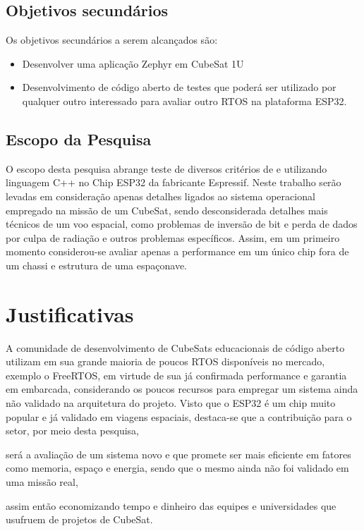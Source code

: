 \subsection{Objetivos secundários}
Os objetivos secundários a serem alcançados são:
\begin{itemize}
\item Desenvolver uma aplicação Zephyr em CubeSat 1U
\item Desenvolvimento de código aberto de testes que poderá ser utilizado por qualquer outro interessado 
para avaliar outro RTOS na plataforma ESP32.
\end{itemize}


\subsection{Escopo da Pesquisa}
O escopo desta pesquisa abrange teste de diversos critérios de \cite{Raymundo} e \cite{Garcia} utilizando linguagem 
C++ no Chip ESP32 da fabricante Espressif. Neste trabalho serão levadas em consideração apenas detalhes ligados ao 
sistema operacional empregado na missão de um CubeSat, sendo desconsiderada detalhes mais técnicos de um voo espacial, 
como problemas de inversão de bit e perda de dados por culpa de radiação e outros problemas específicos. Assim, em 
um primeiro momento considerou-se avaliar apenas a performance em um único chip fora de um chassi e estrutura de uma espaçonave.


\section{Justificativas}
A comunidade de desenvolvimento de CubeSats educacionais de código aberto utilizam em sua grande maioria de 
poucos RTOS disponíveis no mercado, exemplo o FreeRTOS, em virtude de sua já confirmada performance e garantia 
em embarcada, considerando os poucos recursos para empregar um sistema ainda não validado na arquitetura do 
projeto.
Visto que o ESP32 é um chip muito popular e já validado em viagens espaciais, destaca-se que 
a contribuição para o setor, por meio desta pesquisa, 


será a avaliação de um sistema novo e que promete ser mais 
eficiente em fatores como memoria, espaço e energia, sendo que o mesmo ainda não foi validado em uma missão 
real, 



assim então economizando tempo e dinheiro das equipes e universidades que usufruem de projetos de CubeSat.


